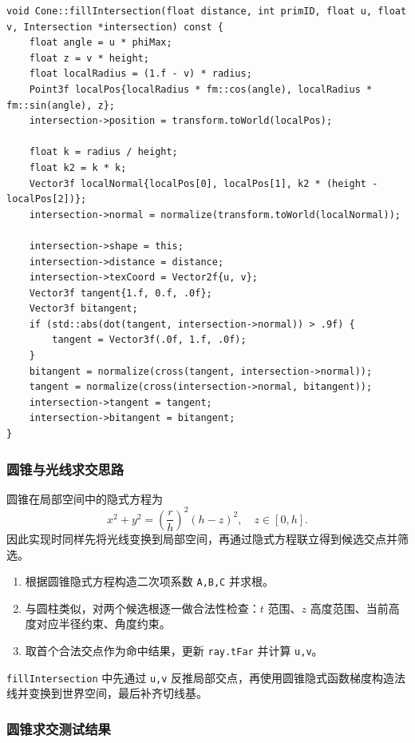 \documentclass{article}
\begin{document}
\begin{lstlisting}[style=cppstyle]
void Cone::fillIntersection(float distance, int primID, float u, float v, Intersection *intersection) const {
    float angle = u * phiMax;
    float z = v * height;
    float localRadius = (1.f - v) * radius;
    Point3f localPos{localRadius * fm::cos(angle), localRadius * fm::sin(angle), z};
    intersection->position = transform.toWorld(localPos);

    float k = radius / height;
    float k2 = k * k;
    Vector3f localNormal{localPos[0], localPos[1], k2 * (height - localPos[2])};
    intersection->normal = normalize(transform.toWorld(localNormal));

    intersection->shape = this;
    intersection->distance = distance;
    intersection->texCoord = Vector2f{u, v};
    Vector3f tangent{1.f, 0.f, .0f};
    Vector3f bitangent;
    if (std::abs(dot(tangent, intersection->normal)) > .9f) {
        tangent = Vector3f(.0f, 1.f, .0f);
    }
    bitangent = normalize(cross(tangent, intersection->normal));
    tangent = normalize(cross(intersection->normal, bitangent));
    intersection->tangent = tangent;
    intersection->bitangent = bitangent;
}
\end{lstlisting}

\subsubsection{圆锥与光线求交思路}

圆锥在局部空间中的隐式方程为
\[
x^2+y^2=\left(\frac{r}{h}\right)^2(h-z)^2,\quad z\in[0,h].
\]
因此实现时同样先将光线变换到局部空间，再通过隐式方程联立得到候选交点并筛选。

\begin{enumerate}
    \item 根据圆锥隐式方程构造二次项系数 \texttt{A,B,C} 并求根。
    \item 与圆柱类似，对两个候选根逐一做合法性检查：$t$ 范围、$z$ 高度范围、当前高度对应半径约束、角度约束。
    \item 取首个合法交点作为命中结果，更新 \texttt{ray.tFar} 并计算 \texttt{u,v}。
\end{enumerate}

\texttt{fillIntersection} 中先通过 \texttt{u,v} 反推局部交点，再使用圆锥隐式函数梯度构造法线并变换到世界空间，最后补齐切线基。

\subsubsection{圆锥求交测试结果}
\end{document}
